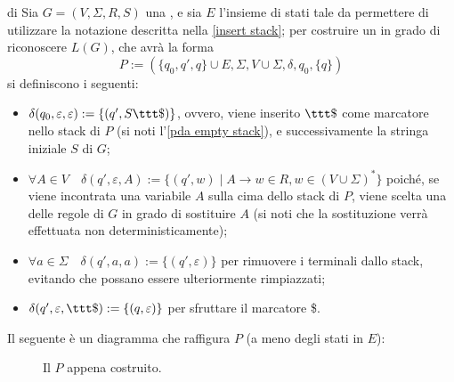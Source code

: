 \documentclass[a4paper, 12pt]{report}
\begin{document}
    \begin{framedmeth}[label={cfg into pda}]{\PDA di \CFG}
        Sia $G = (V, \Sigma, R, S)$ una \CFG, e sia $E$ l'insieme di stati tale da permettere di utilizzare la notazione descritta nella \cref{insert stack}; per costruire un \PDA in grado di riconoscere $L(G)$, che avrà la forma $$P := (\{q_0, q', q\} \cup E, \Sigma, V \cup \Sigma, \delta, q_0, \{q\})$$ si definiscono i seguenti:

        \begin{itemize}
            \item $\delta(q_0, \varepsilon, \varepsilon) := \{(q', S \ttt \$) \}$, ovvero, viene inserito $\ttt \$$ come marcatore nello stack di $P$ (si noti l'\cref{pda empty stack}), e successivamente la stringa iniziale $S$ di $G$;
            \item $\forall A \in V \quad \delta(q', \varepsilon, A) := \{ (q', w) \mid A \to w \in R, w \in (V \cup \Sigma)^*\}$ poiché, se viene incontrata una variabile $A$ sulla cima dello stack di $P$, viene scelta una delle regole di $G$ in grado di sostituire $A$ (si noti che la sostituzione verrà effettuata non deterministicamente);
            \item $\forall a \in \Sigma \quad \delta(q', a, a) := \{ (q', \varepsilon) \}$ per rimuovere i terminali dallo stack, evitando che possano essere ulteriormente rimpiazzati;
            \item $\delta(q', \varepsilon, \ttt \$) := \{(q, \varepsilon) \}$ per sfruttare il marcatore \ttt \$.
        \end{itemize}

        Il seguente è un diagramma che raffigura $P$ (a meno degli stati in $E$):

        \begin{figure}[H]
            \centering
             \caption{Il \PDA $P$ appena costruito.}
        \end{figure}
    \end{framedmeth}
\end{document}
